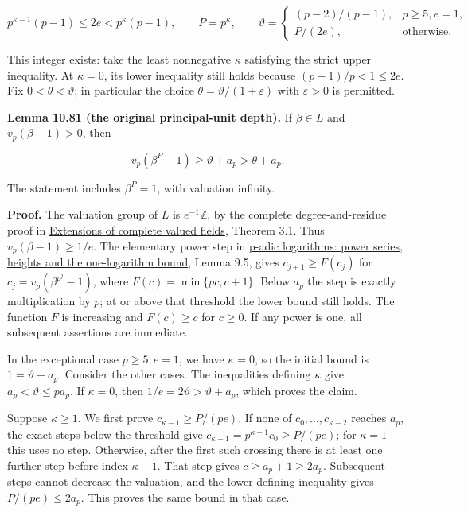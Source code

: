 \documentclass[
  11pt,
  a4paper,
]{article}
\newcounter{none} %
\begin{document}
\[
p^{\kappa-1}(p-1)\le2e<p^\kappa(p-1),\qquad P=p^\kappa,
\qquad
\vartheta=\begin{cases}
(p-2)/(p-1),&p\ge5, e=1,\\
P/(2e),&\text{otherwise}.
\end{cases}
\tag{10.209}
\]

This integer exists: take the least nonnegative \(\kappa\) satisfying
the strict upper inequality. At \(\kappa=0\), its lower inequality still
holds because \((p-1)/p<1\le2e\). Fix \(0<\theta<\vartheta\); in
particular the choice \(\theta=\vartheta/(1+\varepsilon)\) with
\(\varepsilon>0\) is permitted.

\textbf{Lemma 10.81 (the original principal-unit depth).} If
\(\beta\in L\) and \(v_p(\beta-1)>0\), then

\[
v_p(\beta^P-1)\ge\vartheta+a_p>\theta+a_p.
\tag{10.210}
\]

The statement includes \(\beta^P=1\), with valuation infinity.

\textbf{Proof.} The valuation group of \(L\) is \(e^{-1}\mathbb Z\), by
the complete degree-and-residue proof in
\href{../../NT-LOC/NT-LOC-04.html\#3-an-integral-basis-from-residue-digits}{Extensions
of complete valued fields}, Theorem 3.1. Thus \(v_p(\beta-1)\ge1/e\).
The elementary power step in
\href{../TR-BAKER-09.html\#4-taking-powers-until-the-exponential-applies}{p-adic
logarithms: power series, heights and the one-logarithm bound}, Lemma
9.5, gives \(c_{j+1}\ge F(c_j)\) for \(c_j=v_p(\beta^{p^j}-1)\), where
\(F(c)=\min\{pc,c+1\}\). Below \(a_p\) the step is exactly
multiplication by \(p\); at or above that threshold the lower bound
still holds. The function \(F\) is increasing and \(F(c)\ge c\) for
\(c\ge0\). If any power is one, all subsequent assertions are immediate.

In the exceptional case \(p\ge5,e=1\), we have \(\kappa=0\), so the
initial bound is \(1=\vartheta+a_p\). Consider the other cases. The
inequalities defining \(\kappa\) give \(a_p<\vartheta\le p a_p\). If
\(\kappa=0\), then \(1/e=2\vartheta>\vartheta+a_p\), which proves the
claim.

Suppose \(\kappa\ge1\). We first prove \(c_{\kappa-1}\ge P/(pe)\). If
none of \(c_0,\ldots,c_{\kappa-2}\) reaches \(a_p\), the exact steps
below the threshold give \(c_{\kappa-1}=p^{\kappa-1}c_0\ge P/(pe)\); for
\(\kappa=1\) this uses no step. Otherwise, after the first such crossing
there is at least one further step before index \(\kappa-1\). That step
gives \(c\ge a_p+1\ge2a_p\). Subsequent steps cannot decrease the
valuation, and the lower defining inequality gives \(P/(pe)\le2a_p\).
This proves the same bound in that case.
\end{document}
